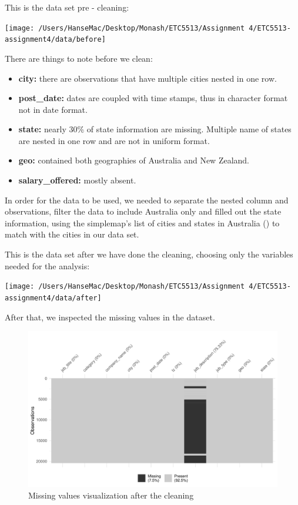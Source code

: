 \documentclass[11pt,a4paper,]{article}
\providecommand{\tightlist}{%
  \setlength{\itemsep}{0pt}\setlength{\parskip}{0pt}}
\begin{document}
This is the data set pre - cleaning:

\texttt{[image: /Users/HanseMac/Desktop/Monash/ETC5513/Assignment 4/ETC5513-assignment4/data/before]}

There are things to note before we clean:

\begin{itemize}
\tightlist
\item
  \textbf{city:} there are observations that have multiple cities nested in one row.\\
\item
  \textbf{post\_date:} dates are coupled with time stamps, thus in character format not in date format.\\
\item
  \textbf{state:} nearly 30\% of state information are missing. Multiple name of states are nested in one row and are not in uniform format.\\
\item
  \textbf{geo:} contained both geographies of Australia and New Zealand.\\
\item
  \textbf{salary\_offered:} mostly absent.
\end{itemize}

In order for the data to be used, we needed to separate the nested column and observations, filter the data to include Australia only and filled out the state information, using the simplemap's list of cities and states in Australia (\textcite{simplemaps_2019}) to match with the cities in our data set.

This is the data set after we have done the cleaning, choosing only the variables needed for the analysis:

\texttt{[image: /Users/HanseMac/Desktop/Monash/ETC5513/Assignment 4/ETC5513-assignment4/data/after]}

After that, we inspected the missing values in the dataset.

\begin{figure}
\centering
\includegraphics{Team_JHDP_Assignment4_files/figure-latex/missing-1.pdf}
\caption{\label{fig:missing}Missing values visualization after the cleaning}
\end{figure}
\end{document}
